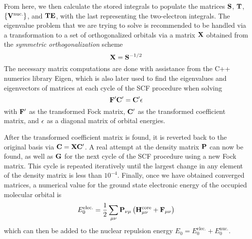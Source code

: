 \documentclass[%
 aip,
 amsmath,amssymb,
 reprint,%
]{revtex4-1}
\begin{document}
From here, we then calculate the stored integrals to populate the matrices 
$\bold{S}$, $\bold{T}$, $\left\{\bold{V}^{\text{nuc.}}\right\}$, and $\bold{TE}$,
with the last representing the two-electron integrals. The eigenvalue problem
that we are trying to solve is recommended to be handled via a transformation
to a set of orthogonalized orbitals via a matrix $\bold{X}$ obtained from 
the \emph{symmetric orthogonalization} scheme
%
\begin{equation}
\bold{X} = \bold{S}^{-1/2}
\end{equation}
%
The necessary matrix computations are done with assistance from the C++
numerics library Eigen\cite{eigenweb}, which is also later used to find the 
eigenvalues and eigenvectors of matrices at each cycle of the SCF procedure
when solving 
\begin{equation}
\bold{F}'\bold{C}' = \bold{C'}\bold{\epsilon}
\end{equation}
with $\bold{F}'$ as the transformed Fock matrix, 
$\bold{C}'$ as the transformed coefficient matrix, and $\bold{\epsilon}$ as a
diagonal matrix of orbital energies.

After the transformed coefficient matrix is found, it is reverted back to the
original basis via $\bold{C} = \bold{X}\bold{C}'$. A real attempt at the density
matrix $\bold{P}$ can now be found, as well as $\bold{G}$ for the next cycle
of the SCF procedure using a new Fock matrix.  This cycle is repeated
iteratively until the largest change in any element of the density matrix is
less than $10^{-4}$.  Finally, once we have obtained converged matrices, a
numerical value for the ground state electronic energy of the occupied
molecular orbital is
\begin{equation}
E_0^{\text{elec.}} = \frac{1}{2} \sum_{\mu\nu} \bold{P}_{\nu\mu} \left(
\bold{H}_{\mu\nu}^{\text{core}} + \bold{F}_{\mu\nu} \right)
\end{equation}
which can then be added to the nuclear repulsion energy 
$E_0 = E_0^{\text{elec.}} + E_0^{\text{nuc.}}$.
\end{document}
